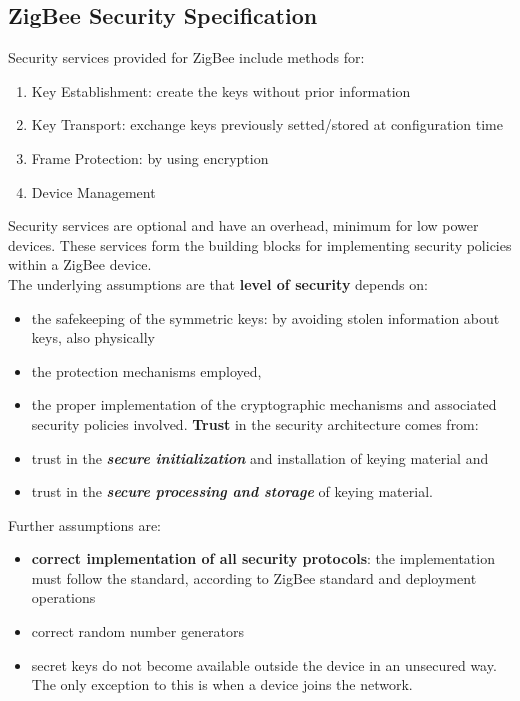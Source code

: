 \documentclass[10pt,a4paper]{report}
\theoremstyle{definition}
\begin{document}
\subsection{ZigBee Security Specification}\label{sec:zigbee-security-specification}
Security services provided for ZigBee include methods for:
\begin{enumerate}
	\item 
	Key Establishment: create the keys without prior information
	\item 
	Key Transport: exchange keys previously setted/stored at configuration time
	\item 
	Frame Protection: by using encryption
	\item 
	Device Management
	
\end{enumerate}
Security services are optional and have an overhead, minimum for low power devices. These services form the building blocks for implementing security policies within a ZigBee device.\\
The underlying assumptions are that \textbf{level of security} depends on:
\begin{itemize}
	\item 
	the safekeeping of the symmetric keys: by avoiding stolen information about keys, also physically
	\item 
	the protection mechanisms employed,
	\item 
	the proper implementation of the cryptographic mechanisms and associated security policies involved.
	\textbf{Trust} in the security architecture comes from:
	\item 
	trust in the \textit{\textbf{secure initialization}} and installation of keying material and
	\item 
	trust in the \textit{\textbf{secure processing and storage}} of keying material.
\end{itemize}

Further assumptions are:
\begin{itemize}
	\item 
	\textbf{correct implementation of all security protocols}: the  implementation must follow the standard, according to ZigBee standard and deployment operations
	\item 
	correct random number generators
	\item 
	secret keys do not become available outside the device in an unsecured way. The only exception to this is when a device joins the network.
\end{itemize}
\end{document}
